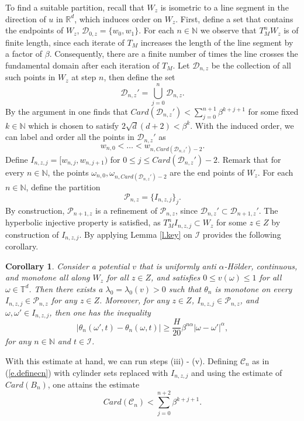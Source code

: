 \documentclass{amsart}
\newtheorem{corollary}{Corollary}
\newcommand{\NN}{\mathbb{N}}
\newcommand{\RR}{\mathbb{R}}
\newcommand{\TT}{\mathbb{T}}
\newcommand{\C}{\mathcal{C}}
\newcommand{\D}{\mathcal{D}}
\newcommand{\I}{\mathcal{I}}
\renewcommand{\P}{\mathcal{P}}
\begin{document}
To find a suitable partition, recall that $W_z$ is isometric to a line segment in the direction of $u$ in $\RR^d$, which induces order on $W_z$. First, define a set that contains the endpoints of $W_z$, $\D_{0,z} = \{w_0, w_1\}$. For each $n\in \NN$ we observe that $T^n_MW_z$ is of finite length, since each iterate of $T_M$ increases the length of the line segment by a factor of $\beta$. Consequently, there are a finite number of times the line crosses the fundamental domain after each iteration of $T_M$. Let $\D_{n,z}$ be the collection of all such points in $W_z$ at step $n$, then define the set
\[\D_{n,z}' = \bigcup_{j=0}^n \D_{n,z}.\]
By the argument in \cite[Lemma 2]{chiem} one finds that $Card(\D_{n,z}')<\sum_{j=0}^{n+1} \beta^{k+j+1}$ for some fixed $k\in \NN$ which is chosen to satisfy $2\sqrt{d}(d+2)<\beta^k$. With the induced order, we can label and order all the points in $\D_{n,z}'$ as
\[w_{n,0} < \dots < w_{n,Card(\D_{n,z}')-2}.\]
Define $I_{n,z,j} = [w_{n,j}, w_{n,j+1})$ for $0\leq j\leq Card(\D_{n,z}')-2$. Remark that for every $n\in \NN$, the points $\omega_{n,0}, \omega_{n,Card(\D_{n,z}')-2}$ are the end points of $W_z$. For each $n\in \NN$, define the partition
\[\P_{n,z} = \{I_{n,z,j}\}_j.\]
By construction, $\P_{n+1,z}$ is a refinement of $\P_{n,z}$, since $\D_{n,z}' \subset \D_{n+1,z}'$. The hyperbolic injective property is satisfied, as $T^n_MI_{n,z,j} \subset W_z$ for some $z\in Z$ by construction of $I_{n,z,j}$. By applying Lemma \ref{l.key} on $\I$ provides the following corollary.

\begin{corollary}\label{c.keycat}
    Consider a potential $v$ that is uniformly anti $\alpha$-H\"older, continuous, and monotone all along $W_z$ for all $z\in Z$, and satisfies $0\leq v(\omega)\leq 1$ for all $\omega \in \TT^d$. Then there exists a $\lambda_0 = \lambda_0(v)>0$ such that $\theta_n$ is monotone on every $I_{n,z,j}\in \P_{n,z}$ for any $z\in Z$. Moreover, for any $z\in Z$, $I_{n,z,j}\in \P_{n,z}$, and $\omega,\omega'\in I_{n,z,j}$, then one has the inequality
    \[|\theta_n(\omega', t)-\theta_n(\omega, t)|\geq \frac{H}{20}\beta^{n\alpha}|\omega-\omega'|^\alpha,\]
    for any $n\in \NN$ and $t\in \I$.
\end{corollary}

With this estimate at hand, we can run steps (iii) - (v). Defining $\C_n$ as in (\ref{e.definecn}) with cylinder sets replaced with $I_{n,z,j}$ and using the estimate of $Card(B_n)$, one attains the estimate
\begin{equation}\label{e.CARD2x}
    Card(\C_n) < \sum_{j=0}^{n+2}\beta^{k+j+1}.
\end{equation}
\end{document}
